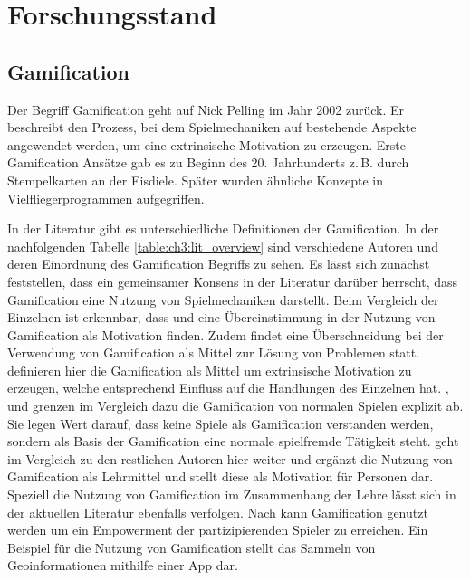 \chapter{Forschungsstand}
\label{ch3:Forschungsstand}

\section{Gamification}
\label{ch3:s:Gamification}

Der Begriff Gamification geht auf Nick Pelling im Jahr 2002 zurück.\cite{Pelling.2011}
Er beschreibt den Prozess, bei dem Spielmechaniken auf bestehende Aspekte angewendet werden, um eine extrinsische Motivation zu erzeugen.\cite{Marczewski.2013}
Erste Gamification Ansätze gab es zu Beginn des 20. Jahrhunderts z.\,B. durch Stempelkarten an der Eisdiele. Später wurden ähnliche Konzepte in Vielfliegerprogrammen aufgegriffen.

In der Literatur gibt es unterschiedliche Definitionen der Gamification.
In der nachfolgenden Tabelle \ref{table:ch3:lit_overview} sind verschiedene Autoren und deren Einordnung des Gamification Begriffs zu sehen.
Es lässt sich zunächst feststellen, dass ein gemeinsamer Konsens in der Literatur darüber herrscht, dass Gamification eine Nutzung von Spielmechaniken darstellt.
Beim Vergleich der Einzelnen ist erkennbar, dass \textcite{Zichermann.2011} und \textcite{Kapp.2012} eine Übereinstimmung in der Nutzung von Gamification als Motivation finden. Zudem findet eine Überschneidung bei der Verwendung von Gamification als Mittel zur Lösung von Problemen statt. \textcite{Zichermann.2011} definieren hier die Gamification als Mittel um extrinsische Motivation zu erzeugen, welche entsprechend Einfluss auf die Handlungen des Einzelnen hat.
\textcite{Deterding.2011}, \textcite{Breuer.2011} und \textcite{Oxford.2013} grenzen im Vergleich dazu die Gamification von normalen Spielen explizit ab. Sie legen Wert darauf, dass keine Spiele als Gamification verstanden werden, sondern als Basis der Gamification eine normale spielfremde Tätigkeit steht.
\textcite{Kapp.2012} geht im Vergleich zu den restlichen Autoren hier weiter und ergänzt die Nutzung von Gamification als Lehrmittel und stellt diese als Motivation für Personen dar. Speziell die Nutzung von Gamification im Zusammenhang der Lehre lässt sich in der aktuellen Literatur ebenfalls verfolgen.\cite{Loh.2012}
Nach \textcite{Jeannerod.2003} kann Gamification genutzt werden um ein Empowerment der partizipierenden Spieler zu erreichen.
Ein Beispiel für die Nutzung von Gamification stellt das Sammeln von Geoinformationen mithilfe einer App dar.\citep{Odobasic.2013}

